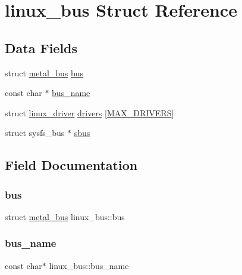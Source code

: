 \hypertarget{structlinux__bus}{}\section{linux\+\_\+bus Struct Reference}
\label{structlinux__bus}
\subsection*{Data Fields}
\begin{DoxyCompactItemize}
\item 
struct \hyperlink{structmetal__bus}{metal\+\_\+bus} \hyperlink{structlinux__bus_a27c49df56bf43dc8c54383a6b356ee2f}{bus}
\item 
const char $\ast$ \hyperlink{structlinux__bus_ad5716dda3d76548038ff7d970f1c848a}{bus\+\_\+name}
\item 
struct \hyperlink{structlinux__driver}{linux\+\_\+driver} \hyperlink{structlinux__bus_a44f6db1cb39b2ae4e996c96bb9e11931}{drivers} \mbox{[}\hyperlink{system_2linux_2device_8c_ac2ee6026a11a2d8472c29fed769c7e9f}{M\+A\+X\+\_\+\+D\+R\+I\+V\+E\+RS}\mbox{]}
\item 
struct sysfs\+\_\+bus $\ast$ \hyperlink{structlinux__bus_a213e122d9780d9ffb83cd84993b9c8e8}{sbus}
\end{DoxyCompactItemize}


\subsection{Field Documentation}
\mbox{\label{structlinux__bus_a27c49df56bf43dc8c54383a6b356ee2f}} 
\subsubsection{\texorpdfstring{bus}{bus}}
{\footnotesize\ttfamily struct \hyperlink{structmetal__bus}{metal\+\_\+bus} linux\+\_\+bus\+::bus}

\mbox{\label{structlinux__bus_ad5716dda3d76548038ff7d970f1c848a}} 
\subsubsection{\texorpdfstring{bus\+\_\+name}{bus\_name}}
{\footnotesize\ttfamily const char$\ast$ linux\+\_\+bus\+::bus\+\_\+name}


